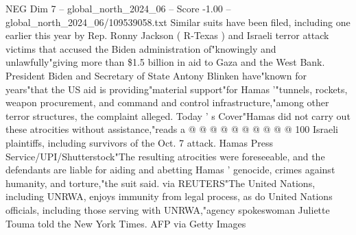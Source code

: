 \begin{textsample}{NEG Dim 7 – global\_north\_2024\_06 – Score -1.00 – global\_north\_2024\_06/109539058.txt}
Similar suits have been filed, including one earlier this year by Rep.
Ronny Jackson ( R-Texas ) and Israeli terror attack victims that accused the Biden administration of"knowingly and unlawfully"giving more than \$1.5 billion in aid to Gaza and the West Bank.
President Biden and Secretary of State Antony Blinken have"known for years"that the US aid is providing"material support"for Hamas '"tunnels, rockets, weapon procurement, and command and control infrastructure,"among other terror structures, the complaint alleged.
Today ' s Cover"Hamas did not carry out these atrocities without assistance,"reads a @ @ @ @ @ @ @ @ @ @ 100 Israeli plaintiffs, including survivors of the Oct. 7 attack.
Hamas Press Service/UPI/Shutterstock"The resulting atrocities were foreseeable, and the defendants are liable for aiding and abetting Hamas ' genocide, crimes against humanity, and torture,"the suit said. via REUTERS"The United Nations, including UNRWA, enjoys immunity from legal process, as do United Nations officials, including those serving with UNRWA,"agency spokeswoman Juliette Touma told the New York Times.
AFP via Getty Images

\end{textsample}
